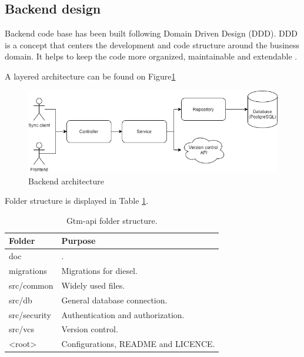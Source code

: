 \subsection{Backend design}\label{subsec:backend-design}
Backend code base has been built following Domain Driven Design (DDD).
DDD is a concept that centers the development and code structure around the business domain.
It helps to keep the code more organized, maintainable and extendable \cite{domain-driven-design}.

A layered architecture can be found on Figure\ref{fig:backend-layered-diagram}
\begin{figure}[H]
    \includegraphics[width=\textwidth]{figures/backend_layered_diagram}
    \caption{Backend architecture}
    \label{fig:backend-layered-diagram}
\end{figure}

Folder structure is displayed in Table
\ref{tab:gtm-api-folder-structure}.
\begin{table}[h]
    \centering
    \begin{tabular}{ | p{3cm} | p{10cm} |}
        \hline
        Folder & Purpose\\
        \hline
        doc &  .\\ %
        \hline
        migrations & Migrations for diesel. \\
        \hline
        src/common & Widely used files.\\
        \hline
        src/db & General database connection.\\
        \hline
        src/security & Authentication and authorization.\\
        \hline
        src/vcs & Version control.\\
        \hline
        <root> & Configurations, README and LICENCE.\\
        \hline
    \end{tabular}
    \caption{Gtm-api folder structure.}
    \label{tab:gtm-api-folder-structure}
\end{table}

